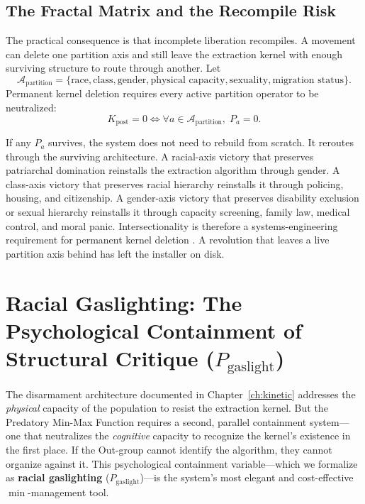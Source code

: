 \subsection{The Fractal Matrix and the Recompile Risk}

The practical consequence is that incomplete liberation recompiles. A movement can delete one partition axis and still leave the extraction kernel with enough surviving structure to route through another. Let
\[
\mathcal{A}_{\text{partition}}=\{\text{race}, \text{class}, \text{gender}, \text{physical capacity}, \text{sexuality}, \text{migration status}\}.
\]
Permanent kernel deletion requires every active partition operator to be neutralized:
\begin{equation}\label{eq:12.13-kernel-deletion-condition}
K_{\text{post}}=0
\Longleftrightarrow
\forall a \in \mathcal{A}_{\text{partition}},\; P_a=0 .
\end{equation}

If any $P_a$ survives, the system does not need to rebuild from scratch. It reroutes through the surviving architecture. A racial-axis victory that preserves patriarchal domination reinstalls the extraction algorithm through gender. A class-axis victory that preserves racial hierarchy reinstalls it through policing, housing, and citizenship. A gender-axis victory that preserves disability exclusion or sexual hierarchy reinstalls it through capacity screening, family law, medical control, and moral panic. Intersectionality is therefore a systems-engineering requirement for permanent kernel deletion \cite{combahee1977,crenshaw_demarginalizing_1989}. A revolution that leaves a live partition axis behind has left the installer on disk.

\section{Racial Gaslighting: The Psychological Containment of Structural Critique (\texorpdfstring{$P_{\text{gaslight}}$}{P\_gaslight})}
\label{sec:gaslighting}

The disarmament architecture documented in Chapter~\ref{ch:kinetic} addresses the \textit{physical} capacity of the population to resist the extraction kernel. But the Predatory Min-Max Function requires a second, parallel containment system---one that neutralizes the \textit{cognitive} capacity to recognize the kernel's existence in the first place. If the Out-group cannot identify the algorithm, they cannot organize against it. This psychological containment variable---which we formalize as \textbf{racial gaslighting} ($P_{\text{gaslight}}$)---is the system's most elegant and cost-effective $\min$-management tool.

